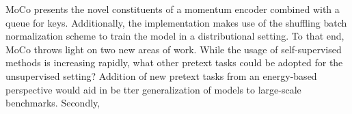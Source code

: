 \documentclass[11pt,letterpaper]{article}
\begin{document}
MoCo presents the novel constituents of a momentum encoder combined with a queue for keys. Additionally, the implementation makes use of the shuffling batch normalization scheme to train the model in a distributional setting. To that end, MoCo throws light on two new areas of work. While the usage of self-supervised methods is increasing rapidly, what other pretext tasks could be adopted for the unsupervised setting? Addition of new pretext tasks from an energy-based perspective would aid in be tter generalization of models to large-scale benchmarks. Secondly, 
\end{document}
